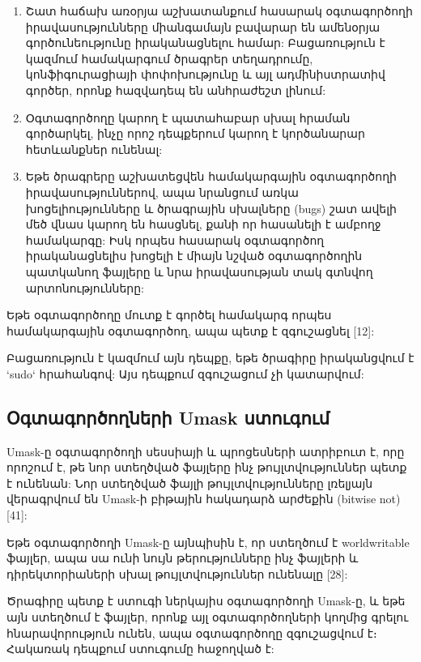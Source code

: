 \documentclass[a4paper,12pt]{article}
\begin{document}
\begin{sloppypar}
\begin{enumerate}
\item Շատ հաճախ առօրյա աշխատանքում հասարակ օգտագործողի իրավասությունները
	միանգամայն բավարար են ամենօրյա գործունեությունը իրականացնելու համար:
	Բացառություն է կազմում համակարգում ծրագրեր տեղադրումը, կոնֆիգուրացիայի
	փոփոխությունը և այլ ադմինիստրատիվ գործեր, որոնք հազվադեպ են անհրաժեշտ
	լինում:
\item Օգտագործողը կարող է պատահաբար սխալ հրաման գործարկել, ինչը որոշ
	դեպքերում կարող է կործանարար հետևանքներ ունենալ:
\item Եթե ծրագրերը աշխատեցվեն համակարգային օգտագործողի իրավասություններով,
	ապա նրանցում առկա խոցելիությունները և ծրագրային սխալները (bugs) շատ
	ավելի մեծ վնաս կարող են հասցնել, քանի որ հասանելի է ամբողջ համակարգը:
	Իսկ որպես հասարակ օգտագործող
	իրականացնելիս խոցելի է միայն նշված օգտագործողին պատկանող ֆայլերը և
	նրա իրավասության տակ գտնվող արտոնությունները:
\end{enumerate}


Եթե օգտագործողը մուտք է գործել համակարգ որպես
համակարգային օգտագործող, ապա պետք է զգուշացնել [12]:

Բացառություն է կազմում այն դեպքը, եթե ծրագիրը իրականցվում է
`sudo` հրահանգով: Այս դեպքում զգուշացում չի կատարվում:


\subsection{Օգտագործողների Umask ստուգում}


Umask-ը օգտագործողի սեսսիայի և պրոցեսների ատրիբուտ է, որը
որոշում է, թե նոր ստեղծված ֆայլերը ինչ թույլտվություններ
պետք է ունենան: Նոր ստեղծված ֆայլի թույլտվությունները
լռելյայն վերագրվում են Umask-ի բիթային հակադարձ արժեքին (bitwise not) [41]:

Եթե օգտագործողի Umask-ը այնպիսին է, որ ստեղծում է
worldwritable ֆայլեր, ապա սա ունի նույն թերությունները
ինչ ֆայլերի և դիրեկտորիաների սխալ թույլտվություններ ունենալը [28]:

Ծրագիրը պետք է ստուգի ներկայիս օգտագործողի Umask-ը, և եթե այն
ստեղծում է ֆայլեր, որոնք այլ օգտագործողների կողմից գրելու
հնարավորություն ունեն, ապա օգտագործողը զգուշացվում է։ Հակառակ
դեպքում ստուգումը հաջողված է:





\end{sloppypar}
\end{document}

